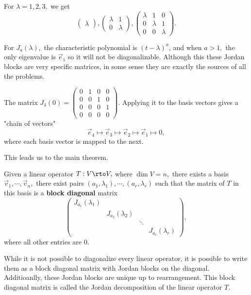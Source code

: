 \begin{example}
For $\lambda = 1, 2, 3,$ we get 
\[
\begin{pmatrix}
\lambda
\end{pmatrix}, \begin{pmatrix} \lambda & 1 \\ 0 & \lambda \end{pmatrix}, \begin{pmatrix}
\lambda & 1 & 0 \\
0 & \lambda & 1 \\
0 & 0 & \lambda
\end{pmatrix}.
\]
\end{example}

For $J_a(\lambda),$ the characteristic polynomial is $(t-\lambda)^a$, and when $a > 1,$ the only eigenvalue is $\vec{e}_1$ so it will not be diagonalizable. Although this these Jordan blocks are very specific matrices, in some sense they are exactly the sources of all the problems.

\begin{example}[$J_4(0)$]
The matrix $J_4(0) = \begin{pmatrix}
0 & 1 & 0 & 0 \\
0 & 0 & 1 & 0 \\
0 & 0 & 0 & 1 \\
0 & 0 & 0 & 0
\end{pmatrix}$. Applying it to the basis vectors gives a "chain of vectors"
\[
\vec{e}_4 \mapsto \vec{e}_3 \mapsto \vec{e}_2 \mapsto \vec{e}_1 \mapsto 0,
\]
where each basis vector is mapped to the next.
\end{example}
This leads us to the main theorem.

\begin{theorem}
Given a linear operator $T: V \rto V,$ where $\dim V = n,$ there exists a basis $\vec{v}_1, \cdots, \vec{v}_n,$ there exist pairs $(a_1, \lambda_1), \cdots, (a_r, \lambda_r)$ such that the matrix of $T$ in this basis is a \textbf{block diagonal} matrix
\[\begin{pmatrix}
J_{a_1}(\lambda_1) &  & & \\
 & J_{a_2}(\lambda_2) &  & \\
 &  & \ddots  & \\
 & & & J_{a_r}(\lambda_r)
\end{pmatrix},\]
where all other entries are 0.
\end{theorem}

While it is not possible to diagonalize every linear operator, it is possible to write them as a block diagonal matrix with Jordan blocks on the diagonal. Additioanlly, these Jordan blocks are unique up to rearrangement. This block diagonal matrix is called the Jordan decomposition of the linear operator $T.$

